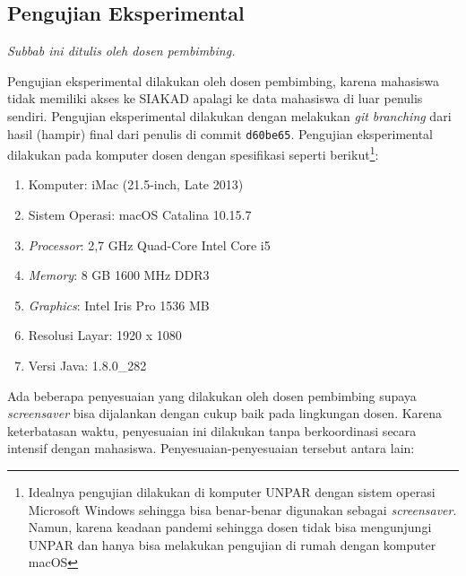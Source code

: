 \subsection{Pengujian Eksperimental}
\textit{Subbab ini ditulis oleh dosen pembimbing.}

Pengujian eksperimental dilakukan oleh dosen pembimbing, karena mahasiswa tidak memiliki akses ke SIAKAD apalagi ke data mahasiswa di luar penulis sendiri. Pengujian eksperimental dilakukan dengan melakukan \textit{git branching} dari hasil (hampir) final dari penulis di commit \texttt{d60be65}. Pengujian eksperimental dilakukan pada komputer dosen dengan spesifikasi seperti berikut\footnote{Idealnya pengujian dilakukan di komputer UNPAR dengan sistem operasi Microsoft Windows sehingga bisa benar-benar digunakan sebagai \textit{screensaver}. Namun, karena keadaan pandemi sehingga dosen tidak bisa mengunjungi UNPAR dan hanya bisa melakukan pengujian di rumah dengan komputer macOS}:

\begin{enumerate}
	\item Komputer: iMac (21.5-inch, Late 2013)
    \item Sistem Operasi: macOS Catalina 10.15.7
    \item \textit{Processor}: 2,7 GHz Quad-Core Intel Core i5
    \item \textit{Memory}: 8 GB 1600 MHz DDR3
    \item \textit{Graphics}: Intel Iris Pro 1536 MB
    \item Resolusi Layar: 1920 x 1080
    \item Versi Java: 1.8.0\_282
\end{enumerate}

Ada beberapa penyesuaian yang dilakukan oleh dosen pembimbing supaya \textit{screensaver} bisa dijalankan dengan cukup baik pada lingkungan dosen. Karena keterbatasan waktu, penyesuaian ini dilakukan tanpa berkoordinasi secara intensif dengan mahasiswa. Penyesuaian-penyesuaian tersebut antara lain:

